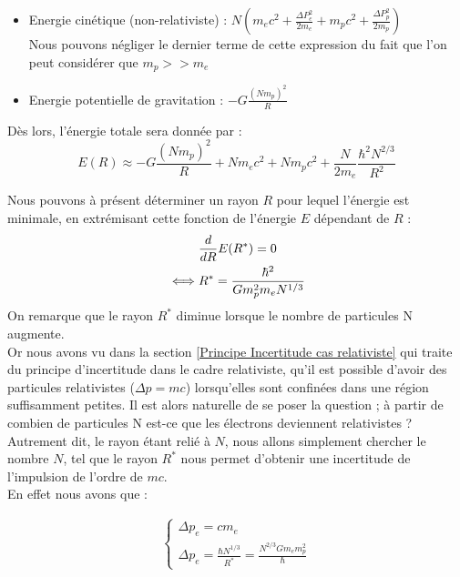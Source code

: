 \documentclass[../Notes de cours]{subfiles}
\begin{document}
\begin{itemize}[label = \textbullet]
\item Energie cinétique (non-relativiste) : $N \left( m_e c^2 + \frac{\Delta P_e^2}{2 m_e} + m_p c^2 + \frac{\Delta P_p^2}{2 m_p} \right)$ \\
Nous pouvons négliger le dernier terme de cette expression du fait que l'on peut considérer que $m_p >> m_e$  
\item Energie potentielle de gravitation : $- G \frac{(Nm_p)^2}{R}$ \\
\end{itemize}

Dès lors, l'énergie totale sera donnée par :
\begin{equation}
E(R) \approx - G \frac{(Nm_p)^2}{R} + Nm_e c^2 + Nm_p c^2 + \frac{N}{2m_e} \frac{\hbar^2 N^{2/3}}{R^2}
\end{equation}

Nous pouvons à présent déterminer un rayon $R$ pour lequel l'énergie est minimale, en extrémisant cette fonction de l'énergie $E$ dépendant de $R$ : 
\begin{align}
\label{rayon d'energie minimale étoile}
    &\frac{d}{dR} E(R^*) = 0 \notag \\
    \iff &R^* = \frac{\hbar^2}{Gm_p^2m_eN^{1/3}}
\end{align}
On remarque que le rayon $R^*$ diminue lorsque le nombre de particules N augmente. \\
Or nous avons vu dans la section \ref{Principe Incertitude cas relativiste} qui traite du principe d'incertitude dans le cadre relativiste, qu'il est possible d'avoir des particules relativistes ($\Delta p = mc$) lorsqu'elles sont confinées dans une région suffisamment petites. Il est alors naturelle de se poser la question ; à partir de combien de particules N est-ce que les électrons deviennent relativistes ? Autrement dit, le rayon étant relié à $N$, nous allons simplement chercher le nombre $N$, tel que le rayon $R^*$ nous permet d'obtenir une incertitude de l'impulsion de l'ordre de $mc$.  \\

En effet nous avons que : 

\begin{align*}
    \left\lbrace
\begin{array}{ccc}
    \Delta p_e = cm_e \\
    \Delta p_e = \frac{\hbar N^{1/3}}{R^*} = \frac{N^{2/3} G m_e m^2_p}{\hbar}
\end{array}\right.
\end{align*}
\end{document}
